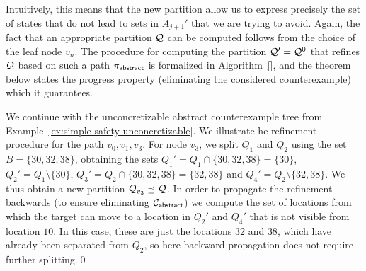 Intuitively, this means that the new partition allow us to express precisely the set of states that do not lead to sets in $A_{j+1}'$ that we are trying to avoid. Again, the fact that an appropriate partition $\mathcal{Q}$ can be computed follows from the choice of the leaf node $v_n$. The procedure for computing the partition $\mathcal{Q}' = \mathcal{Q}^0$ that refines $\mathcal{Q}$ based on such a path $\pi_{\mathsf{abstract}}$ is formalized in Algorithm~\ref{}, and the theorem below states the progress property (eliminating the considered counterexample) which it guarantees.

\begin{example}
We continue with the unconcretizable abstract counterexample tree from Example~\ref{ex:simple-safety-unconcretizable}. We illustrate he refinement procedure for the path $v_0,v_1,v_3$. For node $v_3$, we split $Q_1$ and $Q_2$ using the set $B = \{30,32,38\}$, obtaining the sets $Q_1' = Q_1 \cap \{30,32,38\} = \{30\}$, $Q_2' = Q_1\setminus\{30\}$, $Q_3' = Q_2 \cap \{30,32,38\} = \{32,38\}$ and $Q_4' = Q_2 \setminus \{32,38\}$. We thus obtain a new partition $\mathcal{Q}_{v_3} \preceq \mathcal{Q}$. In order to propagate the refinement backwards (to ensure eliminating $\mathcal{C}_{\mathsf{abstract}}$) we compute the set of locations from which the target can move to a location in $Q_2'$ and $Q_4'$ that is not visible from location $10$. In this case, these are just the locations $32$ and $38$, which have already been separated from $Q_2$, so here backward propagation does not require further splitting.\qed
\end{example}

\begin{theorem}
\end{theorem}
